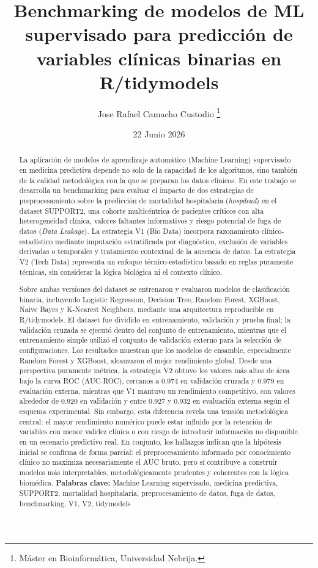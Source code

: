 \documentclass[12pt,a4paper]{article}
\title{Benchmarking de modelos de ML supervisado para predicción de
variables clínicas binarias en R/tidymodels}
\author{Jose Rafael Camacho Custodio%
  \thanks{Máster en Bioinformática, Universidad Nebrija.}}
\date{22 Junio 2026}
\begin{document}
\maketitle

\begin{abstract}\noindent
La aplicación de modelos de aprendizaje automático (Machine Learning)
supervisado en medicina predictiva
depende no solo de la capacidad de los algoritmos, sino también de la calidad
metodológica con la que se preparan los datos clínicos. En este trabajo se
desarrolla un benchmarking para evaluar el impacto de dos
estrategias de preprocesamiento sobre la predicción de mortalidad hospitalaria
(\textit{hospdead}) en el dataset SUPPORT2, una cohorte multicéntrica de
pacientes críticos con alta heterogeneidad clínica, valores faltantes
informativos y riesgo potencial de fuga de datos (\textit{Data Leakage}). La estrategia V1
(Bio Data) incorpora razonamiento clínico-estadístico mediante imputación
estratificada por diagnóstico, exclusión de variables derivadas o temporales y
tratamiento contextual de la ausencia de datos. La estrategia V2 (Tech Data)
representa un enfoque técnico-estadístico basado en reglas puramente técnicas,
sin considerar la lógica biológica ni el contexto clínico.

Sobre ambas versiones del dataset se entrenaron y evaluaron modelos de
clasificación binaria, incluyendo Logistic Regression, Decision Tree, Random
Forest, XGBoost, Naive Bayes y K-Nearest Neighbors,
mediante una arquitectura reproducible en R/tidymodels. El dataset fue dividido
en entrenamiento, validación y prueba final; la validación cruzada se ejecutó
dentro del conjunto de entrenamiento, mientras que el entrenamiento simple
utilizó el conjunto de validación externo para la selección de configuraciones.
Los resultados muestran que los modelos de ensamble, especialmente Random Forest
y XGBoost, alcanzaron el mejor rendimiento global. Desde una perspectiva
puramente métrica, la estrategia V2 obtuvo los valores más altos de área bajo la
curva ROC (AUC-ROC), cercanos a 0.974 en validación cruzada y 0.979 en
evaluación externa, mientras que V1 mantuvo un rendimiento competitivo, con
valores alrededor de 0.920 en validación y entre 0.927 y 0.932 en evaluación
externa según el esquema experimental. Sin embargo, esta diferencia revela una
tensión metodológica central: el mayor rendimiento numérico puede estar
influido por la retención de variables con menor validez clínica o con riesgo
de introducir información no disponible en un escenario predictivo real. En
conjunto, los hallazgos indican
que la hipótesis inicial se confirma de forma parcial: el preprocesamiento
informado por conocimiento clínico no maximiza necesariamente el AUC bruto,
pero sí contribuye a construir modelos más interpretables, metodológicamente
prudentes y coherentes con la lógica biomédica.
\medskip\noindent
\textbf{Palabras clave:} Machine Learning supervisado, medicina predictiva,
SUPPORT2, mortalidad hospitalaria, preprocesamiento de datos, fuga de datos,
benchmarking, V1, V2, tidymodels
\end{abstract}
\end{document}
